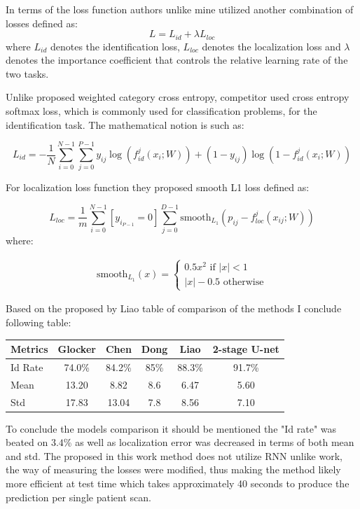 In terms of the loss function authors unlike mine utilized another combination of losses defined as:
\[L = L_{id} + \lambda L_{loc} \]
where $L_{id}$ denotes the identification loss, $L_{loc}$ denotes the localization loss and $\lambda$ denotes the importance coefficient that controls the relative learning rate of the two tasks. 

Unlike proposed weighted category cross entropy, competitor used  cross entropy softmax loss, which is commonly used for classification problems, for the identification task. The mathematical notion is such as:

\[L_{id}  = - \frac{1}{N} \sum_{i=0}^{N-1}\sum_{j=0}^{P-1} y_{ij} \log (f_{id}^j(x_i; W)) + (1-y_{ij}) \log (1-f_{id}^j(x_i;W)) \]

For localization loss function they proposed smooth L1 loss defined as:

\[ L_{loc} = \frac{1}{m} \sum_{i=0}^{N-1} [y_i_{P-1} = 0] \sum_{j=0}^{D-1} \text{smooth}_L_1 (p_{ij} - f_{loc}^j(x_{ij}; W)) \]
where:

\begin{align*}
\text{smooth}_{L_1}(x) =
\begin{cases}
0.5x^2 \mbox{ if } \lvert x \rvert < 1  \\ 
\lvert x \rvert - 0.5 \mbox{ otherwise} \end{cases}
\end{align*}

Based on the proposed by Liao \cite{Liao2018} table of comparison of the methods I conclude following table:   

\begin{table}[htbp]
\centering
\begin{tabular}{|l|c|c|c|c|c|} \hline\hline
Metrics & Glocker & Chen & Dong & Liao & 2-stage U-net \\ \hline
Id Rate & 74.0\% & 84.2\% & 85\% & 88.3\% & 91.7\% \\
Mean & 13.20 & 8.82 & 8.6 & 6.47 & 5.60 \\
Std & 17.83 & 13.04 & 7.8 & 8.56 & 7.10 \\
\hline\hline
\end{tabular}
\end{table}

To conclude the models comparison it should be mentioned the "Id rate" was beated on $3.4$\% as well as localization error was decreased in terms of both mean and std. The proposed in this work method does not utilize RNN unlike \cite{Liao2018} work, the way of measuring the losses were modified, 
thus making the method likely more efficient at test time which takes approximately 40 seconds to produce the prediction per single patient scan. 